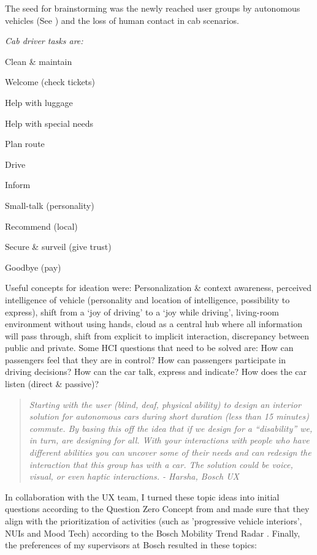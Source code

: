 The seed for brainstorming was the newly reached user groups by autonomous vehicles (See  \emph{}) and the loss of human contact in cab scenarios. 

\emph{Cab driver tasks are:}
\begin{itemize*} 
  \item Clean \& maintain\quad
  \item Welcome (check tickets)\quad
  \item Help with luggage\quad
  \item Help with special needs\quad
  \item Plan route\quad
  \item Drive\quad
  \item Inform\quad
  \item Small-talk (personality)\quad
  \item Recommend (local)\quad
  \item Secure \& surveil (give trust)\quad
  \item Goodbye (pay)\quad
\end{itemize*}

Useful concepts for ideation were: Personalization \& context awareness, perceived intelligence of vehicle (personality and location of intelligence, possibility to express), shift from a ‘joy of driving’ to a ‘joy while driving’, living-room environment without using hands, cloud as a central hub where all information will pass through, shift from explicit to implicit interaction, discrepancy between public and private. Some HCI questions that need to be solved are: How can passengers feel that they are in control? How can passengers participate in driving decisions? How can the car talk, express and indicate? How does the car listen (direct \& passive)?

\begin{quotation}\emph{Starting with the user (blind, deaf, physical ability) to design an interior solution for autonomous cars during short duration (less than 15 minutes) commute. By basing this off the idea that if we design for a “disability” we, in turn, are designing for all. With your interactions with people who have different abilities you can uncover some of their needs and can redesign the interaction that this group has with a car. The solution could be voice, visual, or even haptic interactions. - Harsha, Bosch UX}\end{quotation}

In collaboration with the UX team, I turned these topic ideas into initial questions according to the Question Zero Concept from \cite{RobertBoschUX2017QuestionZero} and made sure that they align with the prioritization of activities (such as 'progressive vehicle interiors', NUIs and Mood Tech) according to the Bosch Mobility Trend Radar \cite{RobertBoschNA2017RegionalRegional}. 
Finally, the preferences of my supervisors at Bosch resulted in these topics:

